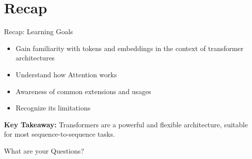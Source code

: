 %

\section{Recap}


\begin{frame}[c]{Recap: Learning Goals}
    \large
    \begin{itemize}[<+(1)->]
        \item Gain familiarity with tokens and embeddings in the context of
            transformer architectures
        \item Understand how Attention works
        \item Awareness of common extensions and usages
        \item Recognize its limitations
    \end{itemize}
    \pause
    \textbf{Key Takeaway:} Transformers are a powerful and flexible
    architecture, suitable for most sequence-to-sequence tasks.
\end{frame}


\addtocounter{framenumber}{1}
\begin{frame}[standout]
    \huge
    What are your Questions?
\end{frame}
